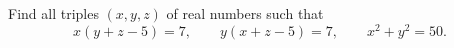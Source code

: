 Find all triples $(x,y,z)$ of real numbers such that
\[x(y+z-5)=7,\qquad y(x+z-5)=7,\qquad x^2+y^2=50.\]

